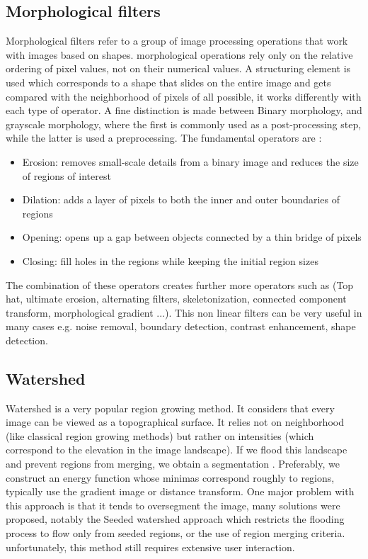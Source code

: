 \documentclass[main.tex]{subfiles}
\begin{document}
\subsection{Morphological filters} 
Morphological filters\cite{Maragos1986, Breen2000} refer to a group of image processing operations that work with images based on shapes.
morphological operations rely only on the relative ordering of pixel values, not on their numerical values. A structuring element is used which corresponds to a shape that slides on the entire image and gets compared with the neighborhood of pixels of all possible, it works differently with each type of operator. A fine distinction is made between Binary morphology, and grayscale morphology, where the first is commonly used as a post-processing step, while the latter is used a preprocessing. The fundamental operators are :
\begin{itemize}
    \item Erosion: removes small-scale details from a binary image and reduces the size of regions of interest
    \item Dilation: adds a layer of pixels to both the inner and outer boundaries of regions
    \item Opening: opens up a gap between objects connected by a thin bridge of pixels
    \item Closing: fill holes in the regions while keeping the initial region sizes
\end{itemize}
The combination of these operators creates further more operators such as (Top hat, ultimate erosion, alternating filters, skeletonization, connected component transform, morphological gradient ...)\cite{Maragos1986, Breen2000}. This non linear filters can be very useful in many cases e.g. noise removal, boundary detection, contrast enhancement, shape detection. 

\subsection{Watershed}
Watershed is a very popular region growing method. It considers that every image can be viewed as a topographical surface. It relies not on neighborhood (like classical region growing methods) but rather on intensities (which correspond to the elevation in the image landscape). If we flood this landscape and prevent regions from merging, we obtain a segmentation \cite{Bengtsson2004}. Preferably, we construct an energy function whose minimas correspond roughly to regions, typically use the gradient image or distance transform. One major problem with this approach is that it tends to oversegment the image, many solutions were proposed, notably the Seeded watershed approach which restricts the flooding process to flow only from seeded regions, or the use of region merging criteria. unfortunately, this method still requires extensive user interaction.
\end{document}
